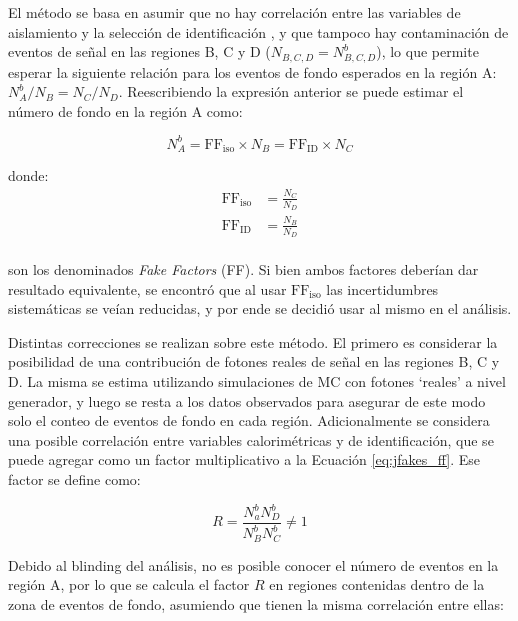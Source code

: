 El método se basa en asumir que no hay correlación entre las variables de aislamiento y la selección de identificación \cite{tesis_tony}, y que tampoco hay contaminación de eventos de señal en las regiones B, C y D ($N_{B,C,D}=N_{B,C,D}^b$), lo que permite esperar la siguiente relación para los eventos de fondo esperados en la región A: $N_A^b / N_B = N_C/N_D$. 
Reescribiendo la expresión anterior se puede estimar el número de fondo en la región A como:

\begin{equation}
  N_A^b = \text{FF}_{\text{iso}}\times N_B = \text{FF}_{\text{ID}}\times N_C
  \label{eq:jfakes_ff}
\end{equation}

\noindent
donde:
\begin{equation}
  \begin{split}
    \text{FF}_{\text{iso}} &= \frac{N_C}{N_D} \\
    \text{FF}_{\text{ID}} &= \frac{N_B}{N_D} \\
  \end{split}
\end{equation}

\noindent
son los denominados \textit{Fake Factors} (FF). 
Si bien ambos factores deberían dar resultado equivalente, se encontró que al usar $\text{FF}_{\text{iso}}$ las incertidumbres sistemáticas se veían reducidas, y por ende se decidió usar al mismo en el análisis.

Distintas correcciones se realizan sobre este método. El primero es considerar la posibilidad de una contribución de fotones reales de señal en las regiones B, C y D. La misma se estima utilizando simulaciones de MC con fotones `reales' a nivel generador, y luego se resta a los datos observados para asegurar de este modo solo el conteo de eventos de fondo en cada región. Adicionalmente se considera una posible correlación entre variables calorimétricas y de identificación, que se puede agregar como un factor multiplicativo a la Ecuación \ref{eq:jfakes_ff}. Ese factor se define como:

\begin{equation}
  R = \frac{N_a^b N_D^b}{N_B^b N_C^b} \neq 1
\end{equation}

Debido al blinding del análisis, no es posible conocer el número de eventos en la región A, por lo que se calcula el factor $R$ en regiones contenidas dentro de la zona de eventos de fondo, asumiendo que tienen la misma correlación entre ellas:

